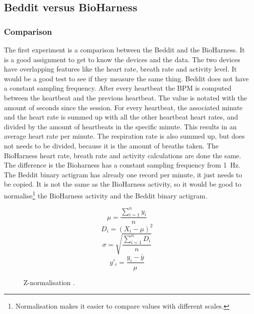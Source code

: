 			

	\subsection{Beddit versus BioHarness}
		\label{sec:bvsb}
		\subsubsection{Comparison}
			The first experiment is a comparison between the Beddit and the BioHarness. It is a good assignment to get to know the devices and the data. The two devices have overlapping features like the heart rate, breath rate and activity level. It would be a good test to see if they measure the same thing. 
			Beddit does not have a constant sampling frequency. After every heartbeat the BPM is computed between the heartbeat and the previous heartbeat. The value is notated with the amount of seconds since the session. For every heartbeat, the associated minute and the heart rate is summed up with all the other heartbeat heart rates, and divided by the amount of heartbeats in the specific minute. This results in an average heart rate per minute. The respiration rate is also summed up, but does not needs to be divided, because it is the amount of breaths taken.
			The BioHarness heart rate, breath rate and activity calculations are done the same. The difference is the Bioharness has a constant sampling frequency from \SI{1}{\hertz}. 
			The Beddit binary actigram has already one record per minute, it just needs to be copied. It is not the same as the BioHarness activity, so it would be good to normalise\footnote{Normalisation makes it easier to compare values with different scales.} the BioHarness activity and the Beddit binary actigram.
			\begin{figure}[h]
				\begin{equation*}
					\label{eq:normalisation}
					\mu = \frac{ \sum\limits_{i=1}^n y_i } { n }
				\end{equation*}
				\begin{equation*}
					D_i = (X_i - \mu)^2
				\end{equation*}
				\begin{equation*}
					\sigma = \sqrt{ \frac{ \sum\limits_{i=1}^n D_i } { n } }
				\end{equation*}
				\begin{equation*}
					y'_i = \frac{ y_i - \bar{y} } { \mu }
				\end{equation*}
				\caption{Z-normalisation \cite{statistics}.}
			\end{figure}

